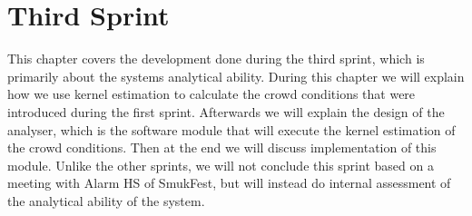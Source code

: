 \chapter{Third Sprint}\label{ch:sprint3}

This chapter covers the development done during the third sprint, which is primarily about the systems analytical ability. During this chapter we will explain how we use kernel estimation to calculate the crowd conditions that were introduced during the first sprint. Afterwards we will explain the design of the analyser, which is the software module that will execute the kernel estimation of the crowd conditions. Then at the end we will discuss implementation of this module. Unlike the other sprints, we will not conclude this sprint based on a meeting with Alarm HS of SmukFest, but will instead do internal assessment of the analytical ability of the system.







